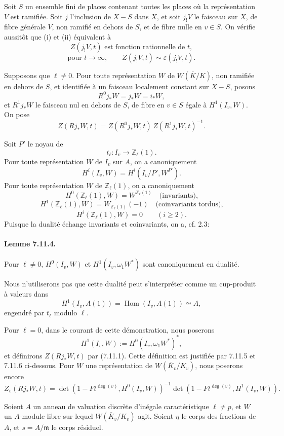 \documentclass[10pt,letterpaper]{article}
\newcommand{\Hom}{\operatorname{Hom}}
\providecommand{\Hom}{\operatorname{Hom}}
\providecommand{\Hom}{\operatorname{Hom}}
\providecommand{\Hom}{\operatorname{Hom}}
\begin{document}
Soit \(S\) un ensemble fini de places contenant toutes les places où la représentation \(V\) est ramifiée. Soit \(j\) l'inclusion de \(X-S\) dans \(X\), et soit \(j_!V\) le faisceau sur \(X\), de fibre générale \(V\), non ramifié en dehors de \(S\), et de fibre nulle en \(v\in S\). On vérifie aussitôt que (i) et (ii) équivalent à
\[
\tag{i'}
Z(j_!V,t)\text{ est fonction rationnelle de }t,
\]
\[
\tag{ii'}
\text{pour }t\to\infty,\qquad Z(j_!V,t)\sim\varepsilon(j_!V,t).
\]

Supposons que \(\ell\ne0\). Pour toute représentation \(W\) de \(W(\overline K/K)\), non ramifiée en dehors de \(S\), et identifiée à un faisceau localement constant sur \(X-S\), posons
\[
R^0j_*W=j_*W=i_*W,
\]
et \(R^1j_*W\) le faisceau nul en dehors de \(S\), de fibre en \(v\in S\) égale à \(H^1(I_v,W)\). On pose
\[
\tag{7.11.1}
Z(Rj_*W,t)=Z(R^0j_*W,t)\,Z(R^1j_*W,t)^{-1}.
\]

Soit \(P'\) le noyau de
\[
t_\ell:I_v\longrightarrow \mathbb Z_\ell(1).
\]
Pour toute représentation \(W\) de \(I_v\) sur \(A\), on a canoniquement
\[
\tag{7.11.2}
H^i(I_v,W)=H^i(I_v/P',W^{P'}).
\]
Pour toute représentation \(W\) de \(\mathbb Z_\ell(1)\), on a canoniquement
\[
\tag{7.11.3}
H^0(\mathbb Z_\ell(1),W)=W^{\mathbb Z_\ell(1)}
\quad\text{(invariants),}
\]
\[
H^1(\mathbb Z_\ell(1),W)=W_{\mathbb Z_\ell(1)}(-1)
\quad\text{(coinvariants tordus),}
\]
\[
H^i(\mathbb Z_\ell(1),W)=0\qquad(i\ge2).
\]
Puisque la dualité échange invariants et coinvariants, on a, cf. 2.3:

\paragraph{Lemme 7.11.4.} Pour \(\ell\ne0\), \(H^0(I_v,W)\) et \(H^1(I_v,\omega_1W^*)\) sont canoniquement en dualité.

Nous n'utiliserons pas que cette dualité peut s'interpréter comme un cup-produit à valeurs dans
\[
H^1(I_v,A(1))=\Hom(I_v,A(1))\simeq A,
\]
engendré par \(t_\ell\) modulo \(\ell\).

Pour \(\ell=0\), dans le courant de cette démonstration, nous poserons
\[
H^1(I_v,W):=H^0(I_v,\omega_1W^*)^*,
\]
et définirons \(Z(Rj_*W,t)\) par (7.11.1). Cette définition est justifiée par 7.11.5 et 7.11.6 ci-dessous. Pour \(W\) une représentation de \(W(\overline K_v/K_v)\), nous poserons encore
\[
Z_v(Rj_*W,t)=
\det(1-Ft^{\deg(v)},H^0(I_v,W))^{-1}
\det(1-Ft^{\deg(v)},H^1(I_v,W)).
\]

Soient \(A\) un anneau de valuation discrète d'inégale caractéristique \(\ell\ne p\), et \(W\) un \(A\)-module libre sur lequel \(W(\overline K_v/K_v)\) agit. Soient \(\eta\) le corps des fractions de \(A\), et \(s=A/\mathfrak m\) le corps résiduel.
\end{document}
